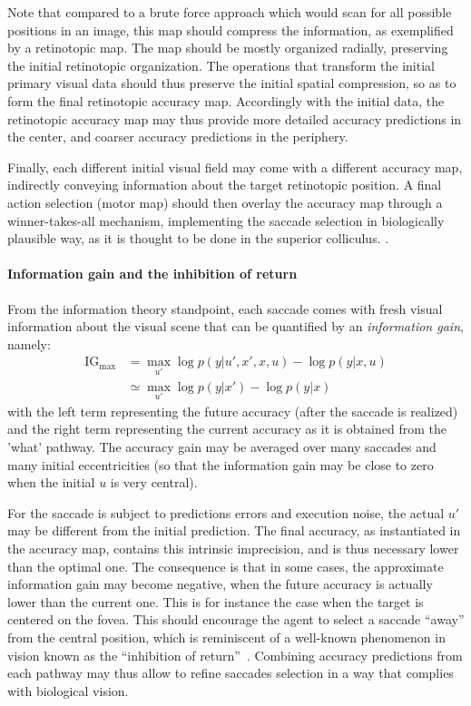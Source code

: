 Note that compared to a brute force approach which would scan for all possible positions in an image, this map should compress the information, as exemplified by a retinotopic map. The map should be mostly organized radially, preserving the initial retinotopic organization. %
The operations that transform the initial primary visual data should thus preserve the initial spatial compression, so as to form the final  retinotopic accuracy map. Accordingly with the initial data, the retinotopic accuracy map may thus provide more detailed accuracy predictions in the center, and coarser accuracy predictions in the periphery. 

Finally, each different initial visual field may come with a different accuracy map, indirectly conveying information about the target retinotopic position. 
A final action selection (motor map) should then overlay the accuracy map through a winner-takes-all mechanism, implementing the saccade selection in biologically plausible way, as it is thought to be done in the superior colliculus\ICANN .
.

\paragraph{Information gain and the inhibition of return}
From the information theory standpoint, each saccade comes with fresh visual information about the visual scene that can be quantified by an \emph{information gain}, namely:
\begin{align}
\text{IG}_\text{max} &= \max_{u'} \log p(y|u',x',x, u) - \log p(y|x, u)\\
          &\simeq \max_{u'} \log p(y|x') - \log p(y|x)
\end{align}
with the left term representing the future accuracy (after the saccade is realized) and the right term representing the current accuracy as it is obtained from the 'what' pathway. The accuracy gain may be averaged over many saccades and many initial eccentricities (so that the information gain may be close to zero when the initial $u$ is very central). 

For the saccade is subject to predictions errors and execution noise, the actual $u'$ may be different from the initial prediction. The final accuracy, as instantiated in the accuracy map, contains this intrinsic imprecision, and is thus necessary lower than the optimal one. The consequence is that in some cases, the approximate information gain may become negative, when the future accuracy is actually lower than the current one. This is for instance the case when the target is centered on the fovea.  This should encourage the agent to select a saccade ``away'' from the central position, which is reminiscent of a well-known phenomenon in vision known as the ``inhibition of return''~\citep{Itti01}. Combining accuracy predictions from each pathway may thus allow to refine saccades selection in a way that complies with biological vision.   

